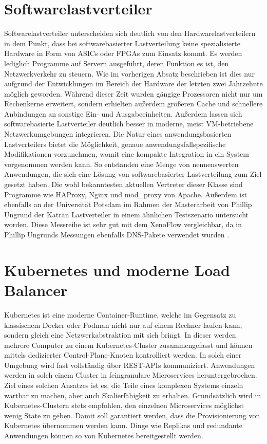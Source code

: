 \section{Softwarelastverteiler}
Softwarelastverteiler unterscheiden sich deutlich von den Hardwarelastverteilern in dem Punkt, dass bei softwarebasierter Lastverteilung keine spezialisierte Hardware in Form von ASICs oder FPGAs zum Einsatz kommt. Es werden lediglich Programme auf Servern ausgeführt, deren Funktion es ist, den Netzwerkverkehr zu steuern. Wie im vorherigen Absatz beschrieben ist dies nur aufgrund der Entwicklungen im Bereich der Hardware der letzten zwei Jahrzehnte möglich geworden. Während dieser Zeit wurden gängige Prozessoren nicht nur um Rechenkerne erweitert, sondern erhielten außerdem größeren Cache und schnellere Anbindungen an sonstige Ein- und Ausgabeeinheiten. Außerdem lassen sich softwarebasierte Lastverteiler deutlich besser in moderne, meist VM-betriebene Netzwerkumgebungen integrieren. Die Natur eines anwendungsbasierten Lastverteilers bietet die Möglichkeit, genaue anwendungsfallspezifische Modifikationen vorzunehmen, womit eine kompakte Integration in ein System vorgenommen werden kann. \cite{softwarelb} So entstanden eine Menge von nennenswerten Anwendungen, die sich eine Lösung von softwarebasierter Lastverteilung zum Ziel gesetzt haben. Die wohl bekanntesten aktuellen Vertreter dieser Klasse sind Programme wie HAProxy, Nginx und mod\_proxy von Apache. \cite{soni2016load} Außerdem ist ebenfalls an der Universität Potsdam im Rahmen der Masterarbeit von Phillip Ungrund der Katran Lastverteiler  in einem ähnlichen Testszenario untersucht worden. Diese Messreihe ist sehr gut mit dem XenoFlow vergleichbar, da in Phillip Ungrunds Messungen ebenfalls DNS-Pakete verwendet wurden \cite{ungrund}. 
\section{Kubernetes und moderne Load Balancer}
Kubernetes ist eine moderne Container-Runtime, welche im Gegensatz zu klassischem Docker oder Podman nicht nur auf einem Rechner laufen kann, sondern gleich eine Netzwerkabstraktion mit sich bringt. In dieser werden mehrere Computer zu einem Kubernetes-Cluster zusammengefasst und können mittels dedizierter Control-Plane-Knoten kontrolliert werden. In solch einer Umgebung wird fast vollständig über REST-APIs kommuniziert. Anwendungen werden in solch einem Cluster in feingranulare Microservices heruntergebrochen. Ziel eines solchen Ansatzes ist es, die Teile eines komplexen Systems einzeln wartbar zu machen, aber auch Skalierfähigkeit zu erhalten. Grundsätzlich wird in Kubernetes-Clustern stets empfohlen, den einzelnen Microservices möglichst wenig State zu geben. Damit soll garantiert werden, dass die Provisionierung von Kubernetes übernommen werden kann. Dinge wie Replikas und redundante Anwendungen können so von Kubernetes bereitgestellt werden. \cite{vasireddy2023kubernetes}

